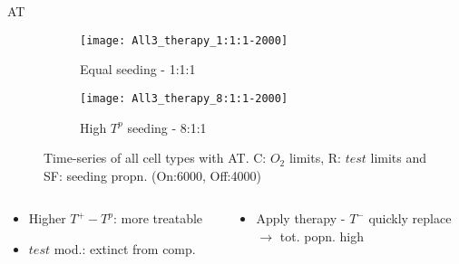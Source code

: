 \begin{frame}{AT}
  \begin{figure}[h]
    \centering
    \begin{subfigure}[b]{0.48\textwidth}
      \centering
      \texttt{[image: All3\_therapy\_1:1:1-2000]}
      \caption{Equal seeding - 1:1:1}
    \end{subfigure}
    \begin{subfigure}[b]{0.48\textwidth}
      \centering
      \texttt{[image: All3\_therapy\_8:1:1-2000]}
      \caption{High $T^p$ seeding - 8:1:1}
    \end{subfigure}
    \caption{Time-series of all cell types with AT. C: $O_2$ limits, R: $test$ limits and SF: seeding propn. (On:6000, Off:4000)}
  \end{figure}
  \begin{columns}
    \begin{column}{0.5\textwidth}
      \begin{itemize}
        \item Higher $T^+ - T^p$: more treatable
        \item $test$ mod.: extinct from comp.
      \end{itemize}
    \end{column}
    \begin{column}{0.5\textwidth}
      \begin{itemize}
        \item Apply therapy - $T^-$ quickly replace \\
        $\rightarrow$ tot. popn. high
      \end{itemize}
    \end{column}
  \end{columns}
\end{frame}

